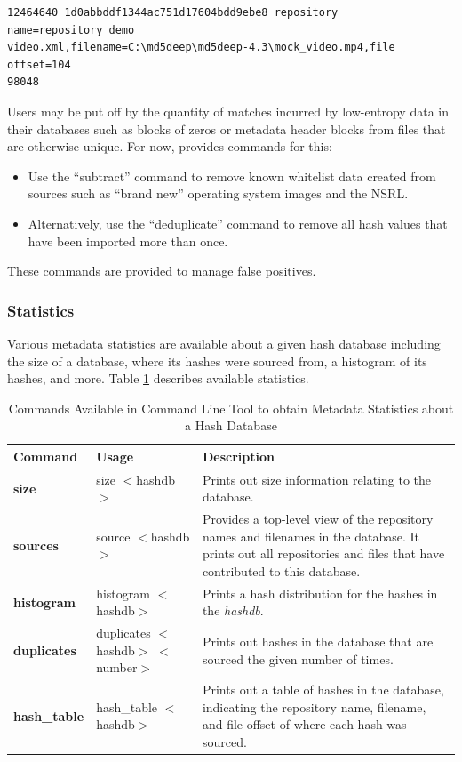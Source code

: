 \documentclass[11pt,fleqn]{article} %
\begin{document}
\begin{lstlisting}[float, caption={The \texttt{identified\_sources.txt} file produced by post-processing the \texttt{identified\_blocks.txt} file. First column is the forensic path, second is the hash value, and third is the repository name, filename, and file offset}, label=identifiedSourceLine]
12464640 1d0abbddf1344ac751d17604bdd9ebe8 repository name=repository_demo_
video.xml,filename=C:\md5deep\md5deep-4.3\mock_video.mp4,file offset=104
98048
\end{lstlisting}

Users may be put off by the quantity of matches incurred by low-entropy data in their databases such as blocks of zeros or metadata header blocks from files that are otherwise unique. For now, \hash provides commands for this:
\begin{itemize}
\item Use the ``subtract'' command to remove known whitelist data created from sources such as ``brand new'' operating system images and the NSRL.
\item Alternatively, use the ``deduplicate'' command to remove all hash values that have been imported more than once.
\end{itemize}
These commands are provided to manage false positives.

\subsubsection{Statistics}
Various metadata statistics are available about a given hash database including the size of a database, where its hashes were sourced from, a histogram of its hashes, and more.
Table \ref{tab:statistics} describes available statistics.

\begin{table}[!ht]
\centering
\caption{Commands Available in \hash Command Line Tool to obtain Metadata Statistics about a Hash Database}
\label{tab:statistics}
\begin{tabular}{|p{3.5 cm}|p{6 cm}|p{4 cm}|}
\hline \hline
\textbf{Command} & \textbf{Usage} & \textbf{Description} \\
\hline
\textbf{size} &  size $<$hashdb$>$ & Prints out size information relating to the database.\\
\hline
\textbf{sources} &  source $<$hashdb$>$ & Provides a top-level view of the repository names and filenames in the database. It prints out all repositories and files that have contributed to this database.\\
\hline
\textbf{histogram} & histogram $<$hashdb$>$ &  Prints a hash distribution for the hashes in the \textit{hashdb}.\\
\hline
\textbf{duplicates} & duplicates $<$hashdb$>$ $<$number$>$ &  Prints out hashes in the database that are sourced the given number of times.\\
\hline
\textbf{hash\_table} & hash\_table $<$hashdb$>$ &  Prints out a table of hashes in the database, indicating the repository name, filename, and file offset of where each hash was sourced.\\
\hline
\end{tabular}
\end{table}
\end{document}
